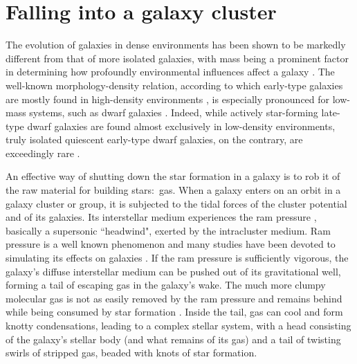 
\section{Falling into a galaxy cluster}

The evolution of galaxies in dense environments has been shown to be markedly different from that of more isolated galaxies, with mass being a prominent factor in determining how profoundly environmental influences affect a galaxy \citep{Boselli2006, Grossi2018a}.
The well-known morphology-density relation, according to which early-type galaxies are mostly found in high-density environments \citep{Dressler1980, Dressler1997}, is especially pronounced for low-mass systems, such as dwarf galaxies \citep{McConnachie2012}.
Indeed, while actively star-forming late-type dwarf galaxies are found almost exclusively in low-density environments, truly isolated quiescent early-type dwarf galaxies, on the contrary, are exceedingly rare \citep{Binggeli1990, Karachentseva2010, Geha2012}.

An effective way of shutting down the star formation in a galaxy is to rob it of the raw material for building stars:~gas.
When a galaxy enters on an orbit in a galaxy cluster or group, it is subjected to the tidal forces of the cluster potential and of its galaxies.
Its interstellar medium experiences the ram pressure \citep{GunnGott1972}, basically a supersonic ``headwind", exerted by the intracluster medium.
Ram pressure is a well known phenomenon and many studies have been devoted to simulating its effects on galaxies \citep[e.g.:][]{Mori2000, Mayer2006, Roediger2008, Roediger2015, Steinhauser2016, Yun2018, Steyrleithner2020}.
If the ram pressure is sufficiently vigorous, the galaxy's diffuse interstellar medium can be pushed out of its gravitational well, forming a tail of escaping \Hi{} gas in the galaxy's wake.
The much more clumpy molecular gas is not as easily removed by the ram pressure and remains behind while being consumed by star formation \citep{Abramson2014, Lee2017, Wang2020}.
Inside the tail, gas can cool and form knotty condensations, leading to a complex stellar system, with a head consisting of the galaxy's stellar body (and what remains of its gas) and a tail of twisting swirls of stripped gas, beaded with knots of star formation.

